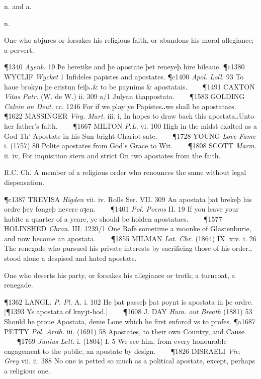 \begin{description}[wide, labelwidth=!, labelindent=0pt]
 n. and a.

\noindent {}

\vspace{-0.3cm}

\begin{myenumerate}

 n.

 One who abjures or forsakes his religious faith, or abandons his moral allegiance; a pervert.

\P 1340 \textit{Ayenb.} 19 Þe heretike and þe apostate þet reneyeþ hire bileaue.
\P c1380 WYCLIF  \textit{Wycket} 1 Infideles papistes and apostates.
\P c1400 \textit{Apol. Loll.} 93 To haue brokyn þe cristun feiþ‥\& to be paynims \& apostatais.    
\P 1491 CAXTON  \textit{Vitas Patr.} (W. de W.) ii. 309 a/1 Julyan thappostata.    
\P 1583 GOLDING  \textit{Calvin on Deut.} cc. 1246 For if we play ye Papistes‥we shall be apostataes.    
\P 1622 MASSINGER  \textit{Virg. Mart.} iii. i, In hopes to draw back this apostata‥Unto her father's faith.    
\P 1667 MILTON  \textit{P.L.} vi. 100 High in the midst exalted as a God Th' Apostate in his Sun-bright Chariot sate.    
\P 1728 YOUNG  \textit{Love Fame} i. (1757) 80 Polite apostates from God's Grace to Wit.    
\P 1808 SCOTT  \textit{Marm.} ii. iv, For inquisition stern and strict On two apostates from the faith.

 R.C. Ch. A member of a religious order who renounces the same without legal dispensation.

\P c1387 TREVISA  \textit{Higden} vii. iv. Rolls Ser. VII. 309 An apostata þat brekeþ his ordre þey fongeþ nevere aȝen.    
\P 1401 \textit{Pol. Poems} II. 19 If you leave your habite a quarter of a yeare, ye should be holden apostataes.    
\P 1577 HOLINSHED  \textit{Chron.} III. 1239/1 One Rafe sometime a moonke of Glastenburie, and now become an apostata.    
\P 1855 MILMAN  \textit{Lat. Chr.} (1864) IX. xiv. i. 26 The renegade who pursued his private interests by sacrificing those of his order‥stood alone a despised and hated apostate.

 One who deserts his party, or forsakes his allegiance or troth; a turncoat, a renegade.

\P 1362 LANGL.  \textit{P. Pl.} A. i. 102 He þat passeþ þat poynt is apostata in þe ordre. 
[\P 1393 Ys apostata  of knyȝt-hod.]    
\P 1608 J. DAY  \textit{Hum. out Breath} (1881) 53 Should he proue Apostata, denie Loue which he first enforcd vs to profes.
\P a1687 PETTY  \textit{Pol. Arith.} iii. (1691) 58 Apostates, to their own Country, and Cause.    
\P 1769 \textit{Junius  Lett.} i. (1804) I. 5 We see him, from every honourable engagement to the public, an apostate by design.    
\P 1826 DISRAELI  \textit{Viv. Grey} vii. ii. 388 No one is petted so much as a political apostate, except, perhaps a religious one.


\end{myenumerate}
\end{description}
